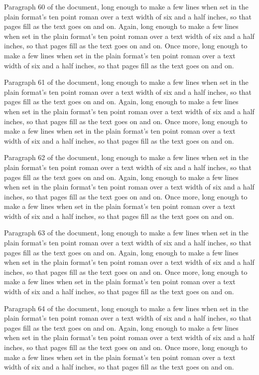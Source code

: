 Paragraph 60 of the document, long enough to make a few lines when set in the plain format's ten point roman over a text width of six and a half inches, so that pages fill as the text goes on and on. Again, long enough to make a few lines when set in the plain format's ten point roman over a text width of six and a half inches, so that pages fill as the text goes on and on. Once more, long enough to make a few lines when set in the plain format's ten point roman over a text width of six and a half inches, so that pages fill as the text goes on and on.

Paragraph 61 of the document, long enough to make a few lines when set in the plain format's ten point roman over a text width of six and a half inches, so that pages fill as the text goes on and on. Again, long enough to make a few lines when set in the plain format's ten point roman over a text width of six and a half inches, so that pages fill as the text goes on and on. Once more, long enough to make a few lines when set in the plain format's ten point roman over a text width of six and a half inches, so that pages fill as the text goes on and on.

Paragraph 62 of the document, long enough to make a few lines when set in the plain format's ten point roman over a text width of six and a half inches, so that pages fill as the text goes on and on. Again, long enough to make a few lines when set in the plain format's ten point roman over a text width of six and a half inches, so that pages fill as the text goes on and on. Once more, long enough to make a few lines when set in the plain format's ten point roman over a text width of six and a half inches, so that pages fill as the text goes on and on.

Paragraph 63 of the document, long enough to make a few lines when set in the plain format's ten point roman over a text width of six and a half inches, so that pages fill as the text goes on and on. Again, long enough to make a few lines when set in the plain format's ten point roman over a text width of six and a half inches, so that pages fill as the text goes on and on. Once more, long enough to make a few lines when set in the plain format's ten point roman over a text width of six and a half inches, so that pages fill as the text goes on and on.

Paragraph 64 of the document, long enough to make a few lines when set in the plain format's ten point roman over a text width of six and a half inches, so that pages fill as the text goes on and on. Again, long enough to make a few lines when set in the plain format's ten point roman over a text width of six and a half inches, so that pages fill as the text goes on and on. Once more, long enough to make a few lines when set in the plain format's ten point roman over a text width of six and a half inches, so that pages fill as the text goes on and on.

